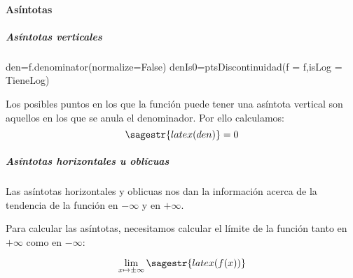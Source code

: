 \paragraph{Asíntotas}
\subparagraph{Asíntotas verticales}

\begin{sagesilent}
den=f.denominator(normalize=False)
denIs0=ptsDiscontinuidad(f = f,isLog = TieneLog)
\end{sagesilent}


\ifverbose
Los posibles puntos en los que la función puede tener una asíntota vertical son aquellos en los que se anula el denominador. 
%
Por ello calculamos:
%
\[\sagestr{latex(den)} = 0 \]
\fi


\subparagraph{Asíntotas horizontales u oblícuas}

\ifverbose
Las asíntotas horizontales y oblicuas nos dan la información acerca de la tendencia de la función en $-\infty$ y en $+\infty$.

Para calcular las asíntotas, necesitamos calcular el límite de la función tanto en $+\infty$ como en $-\infty$:
\fi

\[\lim_{x\mapsto \pm\infty} \sagestr{latex(f(x))} \]


